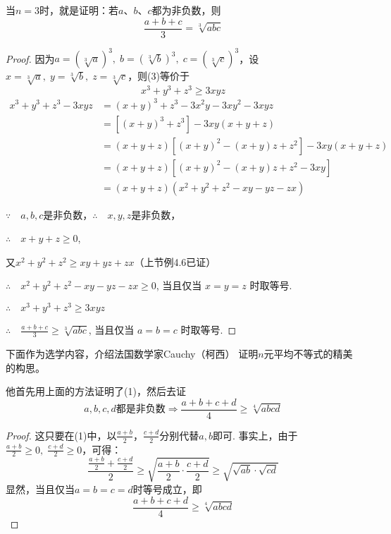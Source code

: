 当$n=3$时，就是证明：若$a$、$b$、$c$都为非负数，则
\begin{equation}
    \frac{a+b+c}{3}=\sqrt[3]{abc} \tag{3}
\end{equation}

\begin{proof}
因为$a=(\sqrt[3]{a})^3,\; b=(\sqrt[3]{b})^3,\; c=(\sqrt[3]{c})^3$，设$x=\sqrt[3]{a},\; y=\sqrt[3]{b},\; z=\sqrt[3]{c}$，则(3)等价于
\begin{equation}
    x^3+y^3+z^3\ge 3xyz  \tag{4}
\end{equation}
\[\begin{split}
    x^{3}+ y^{3}+ z^{3}- 3xyz&=(x+y)^{3}+z^{3}-3x^{2}y-3xy^{2}-3xyz\\
    &=[(x+y)^{3}+z^{3}]-3xy(x+y+z)\\
    &=(x+y+z)[(x+y)^{2}-(x+y)z+z^{2}]-3xy(x+y+z)\\
    &=(x+y+z)[(x+y)^{2}-(x+y)z+z^{2}-3xy]\\
    &=\left(x+y+z\right)\left(x^{2}+y^{2}+z^{2}-xy-yz-zx\right)
\end{split}\]

$\because \quad a,b,c$是非负数，\qquad $\therefore \quad x,y,z$是非负数，

$\therefore\quad x+ y+ z\ge 0$,

又$x^2+y^2+z^2\geq xy+yz+zx$（上节例4.6已证）

$\therefore\quad x^2+ y^2+ z^2- xy- yz- zx\ge  0$, 当且仅当 $x=y=z$ 时取等号.

$\therefore\quad x^3+ y^3+ z^3\ge 3xyz$

$\therefore\quad \frac{a+b+c}{3}\ge \sqrt[3]{abc}$, 当且仅当 $a=b=c$ 时取等号.
\end{proof}

下面作为选学内容，介绍法国数学家Cauchy（柯西）
证明$n$元平均不等式的精美的构思。

他首先用上面的方法证明了(1)，然后去证
\begin{equation}
a,b,c,d\text{都是非负数}\Longrightarrow \frac{a+b+c+d}{4}\ge \sqrt[4]{abcd} \tag{5}
\end{equation}

\begin{proof}
这只要在(1)中，以$\frac{a+b}{2}$，$\frac{c+d}{2}$分别代替$a,b$即可. 事实上，由于$\frac{a+b}{2}\ge 0,\; \frac{c+d}{2}\ge 0$，可得：
\[\frac{\frac{a+b}{2}+\frac{c+d}{2}}{2}\ge \sqrt{\frac{a+b}{2}\cdot \frac{c+d}{2}}\ge \sqrt{\sqrt{ab}\cdot \sqrt{cd}}\]
显然，当且仅当$a=b=c=d$时等号成立，即
\[\frac{a+b+c+d}{4}\ge \sqrt[4]{abcd} \]
\end{proof}


